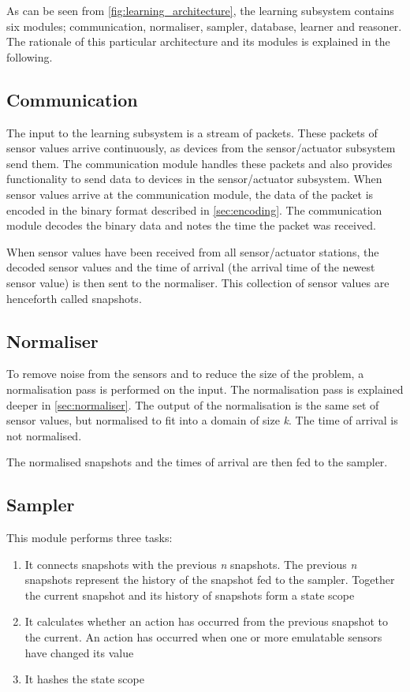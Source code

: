 As can be seen from \cref{fig:learning_architecture}, the learning subsystem contains six modules; communication, normaliser, sampler, database, learner and reasoner. The rationale of this particular architecture and its modules is explained in the following.

\subsection{Communication}
The input to the learning subsystem is a stream of packets. These packets of sensor values arrive continuously, as devices from the sensor/actuator subsystem send them. The communication module handles these packets and also provides functionality to send data to devices in the sensor/actuator subsystem. When sensor values arrive at the communication module, the data of the packet is encoded in the binary format described in \cref{sec:encoding}. The communication module decodes the binary data and notes the time the packet was received.

When sensor values have been received from all sensor/actuator stations, the decoded sensor values and the time of arrival (the arrival time of the newest sensor value) is then sent to the normaliser. This collection of sensor values are henceforth called snapshots.

\subsection{Normaliser}
To remove noise from the sensors and to reduce the size of the problem, a normalisation pass is performed on the input. The normalisation pass is explained deeper in \cref{sec:normaliser}. The output of the normalisation is the same set of sensor values, but normalised to fit into a domain of size \emph{k}. The time of arrival is not normalised.

The normalised snapshots and the times of arrival are then fed to the sampler.

\subsection{Sampler}
This module performs three tasks:

\begin{enumerate}
\item It connects snapshots with the previous \emph{n} snapshots. The previous \emph{n} snapshots represent the history of the snapshot fed to the sampler. Together the current snapshot and its history of snapshots form a state scope
\item It calculates whether an action has occurred from the previous snapshot to the current. An action has occurred when one or more emulatable sensors have changed its value
\item It hashes the state scope
\end{enumerate}

